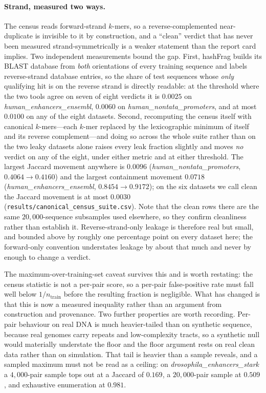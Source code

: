 \documentclass[11pt,a4paper]{article}
\begin{document}
\paragraph{Strand, measured two ways.} The census reads forward-strand $k$-mers, so a
reverse-complemented near-duplicate is invisible to it by construction, and a ``clean'' verdict that
has never been measured strand-symmetrically is a weaker statement than the report card implies. Two
independent measurements bound the gap. First, hashFrag builds its BLAST database from \emph{both}
orientations of every training sequence and labels reverse-strand database entries, so the share of
test sequences whose \emph{only} qualifying hit is on the reverse strand is directly readable: at the
threshold where the two tools agree on seven of eight verdicts it is $0.0025$ on
\textit{human\_enhancers\_ensembl}, $0.0060$ on \textit{human\_nontata\_promoters}, and at most
$0.0100$ on any of the eight datasets. Second, recomputing the census itself with canonical
$k$-mers---each $k$-mer replaced by the lexicographic minimum of itself and its reverse
complement---and doing so across the whole suite rather than on the two leaky datasets alone raises
every leak fraction slightly and moves \emph{no} verdict on any of the eight, under either metric and
at either threshold. The largest Jaccard movement anywhere is $0.0096$
(\textit{human\_nontata\_promoters}, $0.4064\to0.4160$) and the largest containment movement $0.0718$
(\textit{human\_enhancers\_ensembl}, $0.8454\to0.9172$); on the six datasets we call clean the
Jaccard movement is at most $0.0030$ (\texttt{results/canonical\_census\_suite.csv}). Note that the
clean rows there are the same $20{,}000$-sequence subsamples used elsewhere, so they confirm
cleanliness rather than establish it. Reverse-strand-only leakage is
therefore real but small, and bounded above by roughly one percentage point on every dataset here;
the forward-only convention understates leakage by about that much and never by enough to change a
verdict.

The maximum-over-training-set caveat survives this and is worth restating: the census statistic is
not a per-pair score, so a per-pair false-positive rate must fall well below $1/n_{\text{train}}$
before the resulting fraction is negligible. What has changed is that this is now a measured
inequality rather than an argument from construction and provenance. Two further properties are
worth recording. Per-pair behaviour on real DNA is much
heavier-tailed than on synthetic sequence, because real genomes carry repeats and low-complexity
tracts, so a synthetic null would materially understate the floor and the floor argument rests on
real clean data rather than on simulation. That tail is heavier than a sample reveals, and a sampled
maximum must not be read as a ceiling: on \textit{drosophila\_enhancers\_stark} a $4{,}000$-pair
sample tops out at a Jaccard of $0.169$, a $20{,}000$-pair sample at $0.509$, and exhaustive
enumeration at $0.981$.
\end{document}
